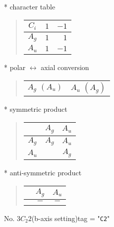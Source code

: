 \documentclass[fleqn,10pt,landscape]{jsarticle}
\begin{document}
* character table
\begin{quote}
\begin{tabular}{crr} \hline \hline
$ C_{i} $ & $ 1 $ & $ -1 $ \\ \hline
$ A_{g} $ & $ 1 $ & $ 1 $ \\
$ A_{u} $ & $ 1 $ & $ -1 $ \\
 \hline \hline
\end{tabular}
\end{quote}
* polar $\leftrightarrow$ axial conversion
\begin{quote}
\begin{tabular}{cc}
$ A_{g}\,\,(A_{u}) $ & $ A_{u}\,\,(A_{g}) $
\end{tabular}
\end{quote}
* symmetric product
\begin{quote}
\begin{tabular}{c|cc} \hline \hline
 & $ A_{g} $ & $ A_{u} $ \\ \hline
$ A_{g} $ & $ A_{g} $ & $ A_{u} $ \\
$ A_{u} $ & $  $ & $ A_{g} $ \\
 \hline \hline
\end{tabular}
\end{quote}
* anti-symmetric product
\begin{quote}
\begin{tabular}{ccc} \hline \hline
 & $ A_{g} $ & $ A_{u} $ \\ \hline
$  $ & $ - $ & $ - $ \\
 \hline \hline
\end{tabular}
\end{quote}
\newpage
No. 3\quad$C_{2}$\quad$2$\quad(b-axis setting)\quad[ monoclinic ]
tag = "{\tt C2}"
\end{document}
